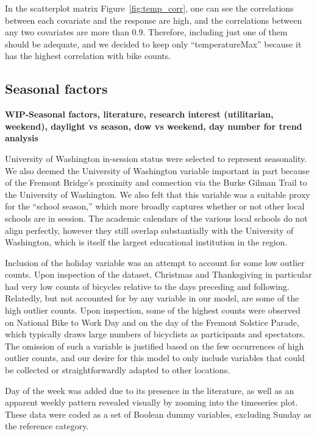 \documentclass [11pt, proquest] {uwthesis}[2015/03/03]
\begin{document}
In the scatterplot matrix Figure~\ref{fig:temp_corr}, one can see the correlations between each covariate and the response are high, and the correlations between any two covariates are more than 0.9. Therefore, including just one of them should be adequate, and we decided to keep only ``temperatureMax'' because it has the highest correlation with bike counts.

\subsection{Seasonal factors}
\textbf{WIP-Seasonal factors, literature, research interest (utilitarian, weekend), daylight vs season, dow vs weekend, day number for trend analysis}

University of Washington in-session status were selected to represent seasonality.
We also deemed the University of Washington variable important in part
because of the Fremont Bridge's proximity and connection via the Burke
Gilman Trail to the University of Washington. We also felt that this
variable was a suitable proxy for the ``school season,'' which more
broadly captures whether or not other local schools are in session.
The academic calendars of the various local schools do not align
perfectly, however they still overlap substantially with the
University of Washington, which is itself the largest educational
institution in the region.

Inclusion of the holiday variable was an attempt to account for
some low outlier counts. Upon inspection of the dataset, Christmas and
Thanksgiving in particular had very low counts of bicycles relative to
the days preceding and following. Relatedly, but not accounted for by
any variable in our model, are some of the high outlier counts. Upon
inspection, some of the highest counts were observed on National Bike
to Work Day and on the day of the Fremont Solstice Parade, which
typically draws large numbers of bicyclists as participants and
spectators. The omission of such a variable is justified based on the
few occurrences of high outlier counts, and our desire for this model
to only include variables that could be collected or straightforwardly
adapted to other locations.

Day of the week was added due to its presence in the literature, as
well as an apparent weekly pattern revealed visually by zooming into
the timeseries plot. These data were coded as a set of Boolean dummy
variables, excluding Sunday as the reference category.
\end{document}

